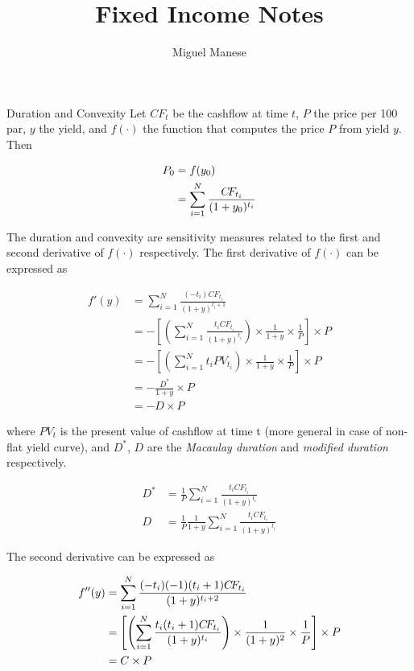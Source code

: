 \documentclass{article}
\title{Fixed Income Notes}
\author{Miguel Manese}
\date{}
\newcommand{\CF}{C\!F}
\newcommand{\PV}{P\!V}
\begin{document}
\maketitle

\begin{section}{Duration and Convexity}
Let $\CF_t$ be the cashflow at time $t$, $P$ the price per 100 par, $y$ the
yield, and $f(\cdot)$ the function that computes the price $P$ from yield
$y$. Then

\begin{align}
P_0 &= f(y_0) \notag\\
  &= \sum_{i=1}^N \frac{\CF_{t_{i}}}{(1 + y_0)^{t_{i}}} \notag
\end{align}

The duration and convexity are sensitivity measures related to the first
and second derivative of $f(\cdot)$ respectively. The first derivative of
$f(\cdot)$ can be expressed as

\begin{align*}
f'(y) &= \sum_{i=1}^N \frac{(- t_i) \CF_{t_{i}}}{(1 + y)^{t_i + 1}} \\
      &= - \left[\left(\sum_{i=1}^N \frac{t_i \CF_{t_{i}}}{(1 + y)^{t_i}} \right)
        \times \frac{1}{1 + y} \times \frac{1}{P}\right] \times P \\
      &= - \left[\left(\sum_{i=1}^N t_i \PV_{t_{i}} \right)
        \times \frac{1}{1 + y} \times \frac{1}{P}\right] \times P \\
      &= - \frac{D^*}{1 + y} \times P \\
      &= - D \times P 
\end{align*}

\noindent where $\PV_t$ is the present value of cashflow at time t (more general
in case of non-flat yield curve), and $D^{*}$, $D$ are the \emph{Macaulay duration} and 
\emph{modified duration} respectively. 

\begin{align*}
D^* &= \frac{1}{P} \sum_{i=1}^N \frac{t_i \CF_{t_{i}}}{(1 + y)^{t_i}}\\
D &= \frac{1}{P} \frac{1}{1 + y} \sum_{i=1}^N \frac{t_i \CF_{t_{i}}}{(1 + y)^{t_i}}
\end{align*}

\noindent The second derivative can be expressed
as

\begin{align}
f''(y) &= \sum_{i=1}^N \frac{(- t_i) (-1)(t_i + 1) 
   \CF_{t_{i}}}{(1 + y)^{t_i + 2}} \notag\\
      &= \left[\left(\sum_{i=1}^N \frac{t_i (t_i + 1) \CF_{t_{i}}}{(1 + y)^{t_i}}
        \right) \times \frac{1}{(1 + y)^2} \times \frac{1}{P}\right]
        \times P \notag\\
      &= C \times P \notag
\end{align}


\end{section}
\end{document}
